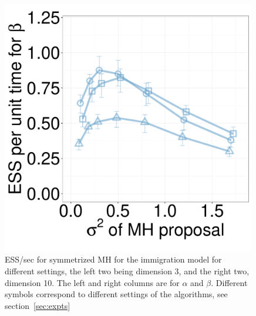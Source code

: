 \begin{figure}[H]
\begin{minipage}[hp]{0.24\linewidth}
	\end{minipage}
  \begin{minipage}[hp]{0.24\linewidth}
  \centering
    \includegraphics [width=0.99\textwidth, angle=0]{figs/new_whole_exp_figs/mh_q_beta_dim10.pdf}
	\end{minipage}
    \caption{ESS/sec for symmetrized MH for the immigration model for different settings, the left two being dimension 3, and the right two, dimension 10. The left and right columns are for $\alpha$ and $\beta$. Different symbols correspond to different settings of the algorithms, see section~\ref{sec:expts}}
     \label{fig:mhESS_Q}
  \end{figure}

